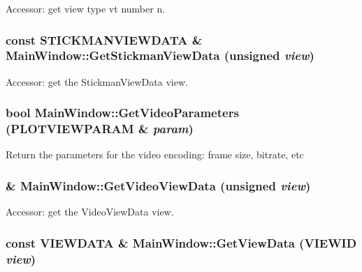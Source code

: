 Accessor: get view type vt number n. 

\hypertarget{class_main_window_2472ff83907f8a1508ae7c0c53d9fcf8}{
\subsubsection[{GetStickmanViewData}]{\setlength{\rightskip}{0pt plus 5cm}const {\bf STICKMANVIEWDATA} \& MainWindow::GetStickmanViewData (unsigned {\em view})}}
\label{class_main_window_2472ff83907f8a1508ae7c0c53d9fcf8}


Accessor: get the StickmanViewData view. 

\hypertarget{class_main_window_61e35778b62387271c2c6e6205edf5e6}{
\subsubsection[{GetVideoParameters}]{\setlength{\rightskip}{0pt plus 5cm}bool MainWindow::GetVideoParameters ({\bf PLOTVIEWPARAM} \& {\em param})}}
\label{class_main_window_61e35778b62387271c2c6e6205edf5e6}


Return the parameters for the video encoding: frame size, bitrate, etc \hypertarget{class_main_window_a41e010b74d2dc3f9fa1ccb9a90837be}{
\subsubsection[{GetVideoViewData}]{ \& MainWindow::GetVideoViewData (unsigned {\em view})}}
\label{class_main_window_a41e010b74d2dc3f9fa1ccb9a90837be}


Accessor: get the VideoViewData view. 

\hypertarget{class_main_window_82b38907180dfd250441a53a99553ea1}{
\subsubsection[{GetViewData}]{\setlength{\rightskip}{0pt plus 5cm}const {\bf VIEWDATA} \& MainWindow::GetViewData ({\bf VIEWID} {\em view})}}
\label{class_main_window_82b38907180dfd250441a53a99553ea1}


